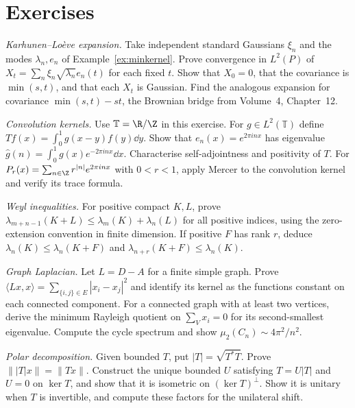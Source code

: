 \section{Exercises}

\begin{exercise}[$\star\star$]\label{ex:kl}
\emph{Karhunen--Lo\`eve expansion.} Take independent standard Gaussians $\xi_n$ and the modes $\lambda_n,e_n$ of Example~\ref{ex:minkernel}. Prove convergence in $L^2(P)$ of $X_t=\sum_n\xi_n\sqrt{\lambda_n}e_n(t)$ for each fixed $t$. Show that $X_0=0$, that the covariance is $\min(s,t)$, and that each $X_t$ is Gaussian. Find the analogous expansion for covariance $\min(s,t)-st$, the Brownian bridge from Volume~4, Chapter~12.
\end{exercise}
\begin{exercise}[$\star$]\label{ex:toeplitz}
\emph{Convolution kernels.} Use $\mathbb T=\R/\Z$ in this exercise. For $g\in L^2(\mathbb T)$ define $Tf(x)=\int_0^1g(x-y)f(y)\dd y$. Show that $e_n(x)=e^{2\pi inx}$ has eigenvalue $\hat g(n)=\int_0^1g(x)e^{-2\pi inx}\dd x$. Characterise self-adjointness and positivity of $T$. For $P_r(x)=\sum_{n\in\Z}r^{|n|}e^{2\pi inx}$ with $0<r<1$, apply Mercer to the convolution kernel and verify its trace formula.
\end{exercise}
\begin{exercise}[$\star\star$]\label{ex:weylineq}
\emph{Weyl inequalities.} For positive compact $K,L$, prove $\lambda_{m+n-1}(K+L)\le\lambda_m(K)+\lambda_n(L)$ for all positive indices, using the zero-extension convention in finite dimension. If positive $F$ has rank $r$, deduce $\lambda_n(K)\le\lambda_n(K+F)$ and $\lambda_{n+r}(K+F)\le\lambda_n(K)$.
\end{exercise}
\begin{exercise}[$\star$]\label{ex:graphlaplacian}
\emph{Graph Laplacian.} Let $L=D-A$ for a finite simple graph. Prove $\langle Lx,x\rangle=\sum_{\{i,j\}\in E}|x_i-x_j|^2$ and identify its kernel as the functions constant on each connected component. For a connected graph with at least two vertices, derive the minimum Rayleigh quotient on $\sum_Vx_i=0$ for its second-smallest eigenvalue. Compute the cycle spectrum and show $\mu_2(C_n)\sim4\pi^2/n^2$.
\end{exercise}
\begin{exercise}[$\star\star$]\label{ex:polar}
\emph{Polar decomposition.} Given bounded $T$, put $|T|=\sqrt{T^*T}$. Prove $\||T|x\|=\|Tx\|$. Construct the unique bounded $U$ satisfying $T=U|T|$ and $U=0$ on $\ker T$, and show that it is isometric on $(\ker T)^\perp$. Show it is unitary when $T$ is invertible, and compute these factors for the unilateral shift.
\end{exercise}
